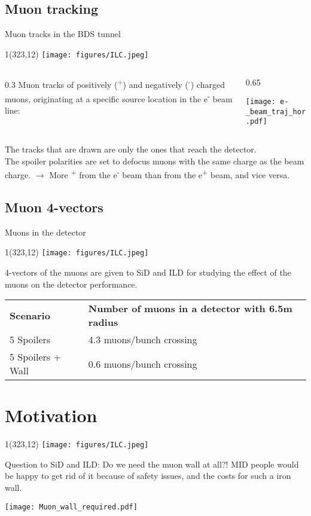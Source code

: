 \documentclass[xcolor={dvipsnames}]{beamer}
\newcommand{\ilclogo}{
  \setlength{\TPHorizModule}{1pt}
  \setlength{\TPVertModule}{1pt}
  \begin{textblock}{1}(323,12)
   \texttt{[image: figures/ILC.jpeg]}
  \end{textblock}
}
\begin{document}
\subsection{Muon tracking}
\begin{frame}{Muon tracks in the BDS tunnel}
\ilclogo

\begin{columns}
 \begin{column}{0.3\textwidth}
  Muon tracks of positively (\textcolor{green}{\textmu\textsuperscript{+}}) and negatively (\textcolor{red}{\textmu\textsuperscript{-}}) charged muons, originating at a specific source location in the e\textsuperscript{-} beam line:
 \end{column}
 \begin{column}{0.65\textwidth}
  \begin{center}
\texttt{[image: e-\_beam\_traj\_hor.pdf]}
\end{center}
 \end{column}
\end{columns}

\small The tracks that are drawn are only the ones that reach the detector.\\
\small The spoiler polarities are set to defocus muons with the same charge as the beam charge. $\rightarrow$ More \textmu\textsuperscript{+} from the e\textsuperscript{-} beam than from the e\textsuperscript{+} beam, and vice versa.
\end{frame}

\subsection{Muon 4-vectors}
\begin{frame}{Muons in the detector}
\ilclogo
4-vectors of the muons are given to SiD and ILD for studying the effect of the muons on the detector performance.\\
\vspace*{0.2cm}
\begin{tabular}{ll}
\textbf{Scenario} & \textbf{Number of muons in a detector with 6.5m radius}\\
 5 Spoilers& 4.3 muons/bunch crossing\\
 5 Spoilers + Wall & 0.6 muons/bunch crossing
\end{tabular}
\end{frame}

\section{Motivation}
\begin{frame}{}
\ilclogo
Question to SiD and ILD: Do we need the muon wall at all?!
MID people would be happy to get rid of it because of safety issues, and the costs for such a iron wall.
\begin{center}
\texttt{[image: Muon\_wall\_required.pdf]}
\end{center}
\end{frame}
\end{document}
